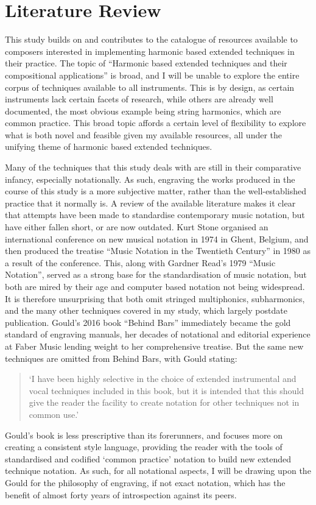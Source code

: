\newpage
\section{Literature Review}
This study builds on and contributes to the catalogue of resources available to composers interested in implementing harmonic based extended techniques in their practice. The topic of “Harmonic based extended techniques and their compositional applications” is broad, and I will be unable to explore the entire corpus of techniques available to all instruments. This is by design, as certain instruments lack certain facets of research, while others are already well documented, the most obvious example being string harmonics, which are common practice. This broad topic affords a certain level of flexibility to explore what is both novel and feasible given my available resources, all under the unifying theme of harmonic based extended techniques.

Many of the techniques that this study deals with are still in their comparative infancy, especially notationally. As such, engraving the works produced in the course of this study is a more subjective matter, rather than the well-established practice that it normally is. A review of the available literature makes it clear that attempts have been made to standardise contemporary music notation, but have either fallen short, or are now outdated. Kurt Stone organised an international conference on new musical notation in 1974 in Ghent, Belgium, and then produced the treatise “Music Notation in the Twentieth Century” in 1980 as a result of the conference.\autocite[xiii]{stoneMusicNotationTwentieth1980} This, along with Gardner Read’s 1979 “Music Notation”, served as a strong base for the standardisation of music notation, but both are mired by their age and computer based notation not being widespread.\autocite{readCompendiumModernInstrumental1993} It is therefore unsurprising that both omit stringed multiphonics, subharmonics, and the many other techniques covered in my study, which largely postdate publication. Gould’s 2016 book “Behind Bars” immediately became the gold standard of engraving manuals, her decades of notational and editorial experience at Faber Music lending weight to her comprehensive treatise. But the same new techniques are omitted from Behind Bars, with Gould stating: 
\begin{quotation}
    ‘I have been highly selective in the choice of extended instrumental and vocal techniques included in this book, but it is intended that this should give the reader the facility to create notation for other techniques not in common use.’\autocite[iii]{gouldBars2011} 
\end{quotation}
Gould’s book is less prescriptive than its forerunners, and focuses more on creating a consistent style language, providing the reader with the tools of standardised and codified ‘common practice’ notation to build new extended technique notation. As such, for all notational aspects, I will be drawing upon the Gould for the philosophy of engraving, if not exact notation, which has the benefit of almost forty years of introspection against its peers.

